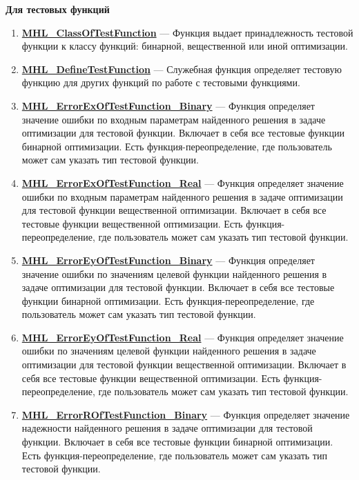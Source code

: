 \documentclass[a4paper,12pt]{article}
\begin{document}
\textbf{Для тестовых функций}
\begin{enumerate}

\item \textbf{\hyperref[MHL_ClassOfTestFunction]{MHL\_ClassOfTestFunction}} --- Функция выдает принадлежность тестовой функции к классу функций: бинарной, вещественной или иной оптимизации.

\item \textbf{\hyperref[MHL_DefineTestFunction]{MHL\_DefineTestFunction}} --- Служебная функция определяет тестовую функцию для других функций по работе с тестовыми функциями.

\item \textbf{\hyperref[MHL_ErrorExOfTestFunction_Binary]{MHL\_ErrorExOfTestFunction\_Binary}} --- Функция определяет значение ошибки по входным параметрам найденного решения в задаче оптимизации для тестовой функции. Включает в себя все тестовые функции бинарной оптимизации. Есть функция-переопределение, где пользователь может сам указать тип тестовой функции.

\item \textbf{\hyperref[MHL_ErrorExOfTestFunction_Real]{MHL\_ErrorExOfTestFunction\_Real}} --- Функция определяет значение ошибки по входным параметрам найденного решения в задаче оптимизации для тестовой функции вещественной оптимизации. Включает в себя все тестовые функции вещественной оптимизации. Есть функция-переопределение, где пользователь может сам указать тип тестовой функции.

\item \textbf{\hyperref[MHL_ErrorEyOfTestFunction_Binary]{MHL\_ErrorEyOfTestFunction\_Binary}} --- Функция определяет значение ошибки по значениям целевой функции найденного решения в задаче оптимизации для тестовой функции. Включает в себя все тестовые функции бинарной оптимизации. Есть функция-переопределение, где пользователь может сам указать тип тестовой функции.

\item \textbf{\hyperref[MHL_ErrorEyOfTestFunction_Real]{MHL\_ErrorEyOfTestFunction\_Real}} --- Функция определяет значение ошибки по значениям целевой функции найденного решения в задаче оптимизации для тестовой функции вещественной оптимизации. Включает в себя все тестовые функции вещественной оптимизации. Есть функция-переопределение, где пользователь может сам указать тип тестовой функции.

\item \textbf{\hyperref[MHL_ErrorROfTestFunction_Binary]{MHL\_ErrorROfTestFunction\_Binary}} --- Функция определяет значение надежности найденного решения в задаче оптимизации для тестовой функции. Включает в себя все тестовые функции бинарной оптимизации. Есть функция-переопределение, где пользователь может сам указать тип тестовой функции.


\end{enumerate}
\end{document}
